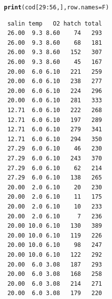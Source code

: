 \documentclass[oneside]{book}\usepackage[]{graphicx}\usepackage[svgnames]{xcolor}
\makeatletter
\newcommand{\hlnum}[1]{\textcolor[rgb]{0.686,0.059,0.569}{#1}}%
\newcommand{\hlopt}[1]{\textcolor[rgb]{0,0,0}{#1}}%
\newcommand{\hlstd}[1]{\textcolor[rgb]{0.345,0.345,0.345}{#1}}%
\newcommand{\hlkwc}[1]{\textcolor[rgb]{0.333,0.667,0.333}{#1}}%
\newcommand{\hlkwd}[1]{\textcolor[rgb]{0.737,0.353,0.396}{\textbf{#1}}}%
\newenvironment{kframe}{%
 \def\at@end@of@kframe{}%
 \ifinner\ifhmode%
  \def\at@end@of@kframe{\end{minipage}}%
  \begin{minipage}{\columnwidth}%
 \fi\fi%
 \def\FrameCommand##1{\hskip\@totalleftmargin \hskip-\fboxsep
 \colorbox{shadecolor}{##1}\hskip-\fboxsep
     \hskip-\linewidth \hskip-\@totalleftmargin \hskip\columnwidth}%
 \MakeFramed {\advance\hsize-\width
   \@totalleftmargin\z@ \linewidth\hsize
   \@setminipage}}%
 {\par\unskip\endMakeFramed%
 \at@end@of@kframe}
\newenvironment{knitrout}{}{} %
\makeatother
\begin{document}
\begin{minipage}{0.4\textwidth}
\begin{knitrout}
\color{fgcolor}\begin{kframe}
\begin{alltt}
\hlkwd{print}\hlstd{(cod[}\hlnum{29}\hlopt{:}\hlnum{56}\hlstd{, ],} \hlkwc{row.names} \hlstd{= F)}
\end{alltt}
\begin{verbatim}
 salin temp   O2 hatch total
 26.00  9.3 8.60    74   293
 26.00  9.3 8.60    68   181
 26.00  9.3 8.60   152   307
 26.00  9.3 8.60    45   167
 20.00  6.0 6.10   221   259
 20.00  6.0 6.10   238   277
 20.00  6.0 6.10   224   296
 20.00  6.0 6.10   281   333
 12.71  6.0 6.10   222   268
 12.71  6.0 6.10   197   289
 12.71  6.0 6.10   279   341
 12.71  6.0 6.10   294   350
 27.29  6.0 6.10    46   230
 27.29  6.0 6.10   243   370
 27.29  6.0 6.10    62   214
 27.29  6.0 6.10   138   265
 20.00  2.0 6.10    20   230
 20.00  2.0 6.10    11   175
 20.00  2.0 6.10    10   233
 20.00  2.0 6.10     7   236
 20.00 10.0 6.10   130   389
 20.00 10.0 6.10   119   226
 20.00 10.0 6.10    98   247
 20.00 10.0 6.10   122   292
 20.00  6.0 3.08   187   293
 20.00  6.0 3.08   168   258
 20.00  6.0 3.08   214   271
 20.00  6.0 3.08   179   220
\end{verbatim}
\end{kframe}
\end{knitrout}
\end{minipage}
\end{document}
